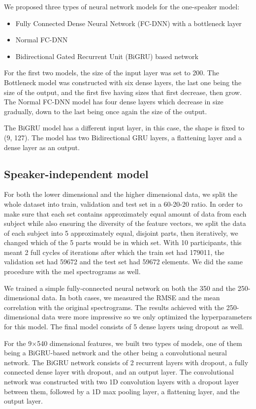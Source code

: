 \documentclass{article}
\begin{document}
We proposed three types of neural network models for the one-speaker model:
\begin{itemize}
    \item Fully Connected Dense Neural Network (FC-DNN) with a bottleneck layer
    \item Normal FC-DNN
    \item Bidirectional Gated Recurrent Unit (BiGRU) based network
\end{itemize}

For the first two models, the size of the input layer was set to 200. The Bottleneck model was constructed with six dense layers, the last one being the size of the output, and the first five having sizes that first decrease, then grow. The Normal FC-DNN model has four dense layers which decrease in size gradually, down to the last being once again the size of the output.

The BiGRU model has a different input layer, in this case, the shape is fixed to (9, 127). The model has two Bidirectional GRU layers, a flattening layer and a dense layer as an output.


\subsection{Speaker-independent model}

For both the lower dimensional and the higher dimensional data, we split the whole dataset into train, validation and test set in a 60-20-20 ratio. In order to make sure that each set contains approximately equal amount of data from each subject while also ensuring the diversity of the feature vectors, we split the data of each subject into 5 approximately equal, disjoint parts, then iteratively, we changed which of the 5 parts would be in which set. With 10 participants, this meant 2 full cycles of iterations after which the train set had 179011, the validation set had 59672 and the test set had 59672 elements. We did the same procedure with the mel spectrograms as well.

We trained a simple fully-connected neural network on both the 350 and the 250-dimensional data. In both cases, we measured the RMSE and the mean correlation with the original spectrograms. The results achieved with the 250-dimensional data were more impressive so we only optimized the hyperparameters for this model. The final model consists of 5 dense layers using dropout as well.

For the 9$\times$540 dimensional features, we built two types of models, one of them being a BiGRU-based network and the other being a convolutional neural network. The BiGRU network consists of 2 recurrent layers with dropout, a fully connected dense layer with dropout, and an output layer. The convolutional network was constructed with two 1D convolution layers with a dropout layer between them, followed by a 1D max pooling layer, a flattening layer, and the output layer.
\end{document}
